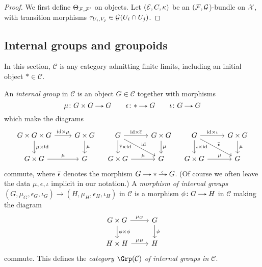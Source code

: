 \begin{proof}
  We first define $\Theta_{\mathcal{F},\mathcal{F}'}$ on objects. Let $(\mathcal{E},C,\kappa)$ be
  an $(\mathcal{F},\mathcal{G}$)-bundle on $\mathcal{X}$, with transition morphisms
  $\tau_{U_i,V_j} \in \mathcal{G}(U_i \cap U_j)$.
\end{proof}


\begin{appendices}
  \section{Internal groups and groupoids}

  \renewcommand{\C}{\mathcal{C}}
  \begin{notation}
    In this section, $\C$ is any category admitting finite limits,
    including an initial object $* \in \C$.
  \end{notation}

  \begin{definitions}
    An \emph{internal group} in $\C$ is an object $G \in \C$ together
    with morphisms
    \[
    \mu \c G \times G \to G \qquad
    \epsilon \c * \to G \qquad
    \iota \c G \to G
    \]
    which make the diagrams
    \[
    \begin{tikzcd}
      G \times G \times G \ar[r, "\id \times \mu"] \ar[d, "\mu \times
      \id"] & G \times G \ar[d, "\mu"] \\ G \times G \ar[r, "\mu"] &
      G
    \end{tikzcd}
    \quad
    \begin{tikzcd}
      G \ar[r, "\id \times \o\epsilon"] \ar[d, "\o\epsilon \times
      \id"] \ar[rd, "\id"] & G \times G \ar[d, "\mu"] \\ G \times G
      \ar[r, "\mu"] & G
    \end{tikzcd}
    \quad
    \begin{tikzcd}
      G \ar[r, "\id \times \iota"] \ar[d, "\iota \times \id"] \ar[rd,
      "\o\epsilon"] & G \times G \ar[d, "\mu"] \\ G \times G \ar[r,
      "\mu"] & G
    \end{tikzcd}
    \]
    commute, where $\overline\epsilon$ denotes the morphism $G \to *
    \lblto{\epsilon} G$. (Of course we often leave the data
    $\mu,\epsilon,\iota$ implicit in our notation.) A \emph{morphism
      of internal groups} $(G,\mu_G,\epsilon_G,\iota_G) \to
    (H,\mu_H,\epsilon_H,\iota_H)$ in $\C$ is a morphism $\phi \c G \to
    H$ in $\C$ making the diagram
    \[
    \begin{tikzcd}
      G \times G \ar[r, "\mu_G"] \ar[d, "\phi \times \phi"] & G \ar[d,
      "\phi"] \\ H \times H \ar[r, "\mu_H"] & H
    \end{tikzcd}
    \]
    commute. This defines the \emph{category $\Grp(\C)$ of internal
      groups in $\C$}.
  \end{definitions}
  

\end{appendices}
